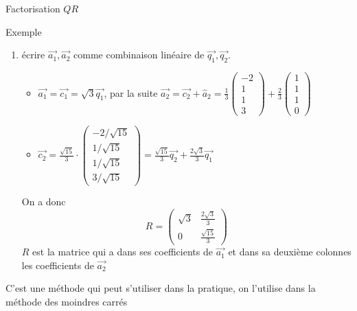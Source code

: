 \begin{parag}{Factorisation $QR$}
\begin{subparag}{Exemple}
\begin{enumerate}
\[\begin{pmatrix}
            1/\sqrt{3} & -2/\sqrt{15}\\
            1/\sqrt{3} & 1/\sqrt{15}\\
            1/\sqrt{3} & 1/\sqrt{15}\\
            0 &3/\sqrt{15}
        \end{pmatrix}\]   
        \item écrire $\vec{a_1}, \vec{a_2}$ comme combinaison linéaire de $\vec{q_1}, \vec{q_2}$.
        \begin{itemize}
            \item $\vec{a_1} = \vec{c_1} = \sqrt{3}\vec{q_1}$, par la suite 
            $\vec{a_2} = \vec{c_2} + \hat{a}_2 = \frac{1}{3}\begin{pmatrix}
                -2 \\ 1 \\ 1 \\ 3
            \end{pmatrix} + \frac{2}{3}\begin{pmatrix}
                1 \\ 1 \\ 1 \\ 0
            \end{pmatrix}$
            \item $\vec{c_2} = \frac{\sqrt{15}}{3}\cdot\begin{pmatrix}
                -2/\sqrt{15} \\ 1/\sqrt{15} \\ 1/\sqrt{15} \\ 3/\sqrt{15}
            \end{pmatrix} =  \frac{\sqrt{15}}{3}\vec{q_2} + \frac{2\sqrt{3}}{3}\vec{q_1}$
        \end{itemize}
        On a donc 
        \[ R = \begin{pmatrix}
            \sqrt{3} & \frac{2\sqrt{3}}{3}\\
            0 & \frac{\sqrt{15}}{3}
        \end{pmatrix}\]
        $R$ est la matrice qui a dans ses coefficients de $\vec{a_1}$ et dans sa deuxième colonnes les coefficients de $\vec{a_2}$
        \end{enumerate}
        C'est une méthode qui peut s'utiliser dans la pratique, on l'utilise dans la méthode des moindres carrés
    \end{subparag}
\end{parag}

